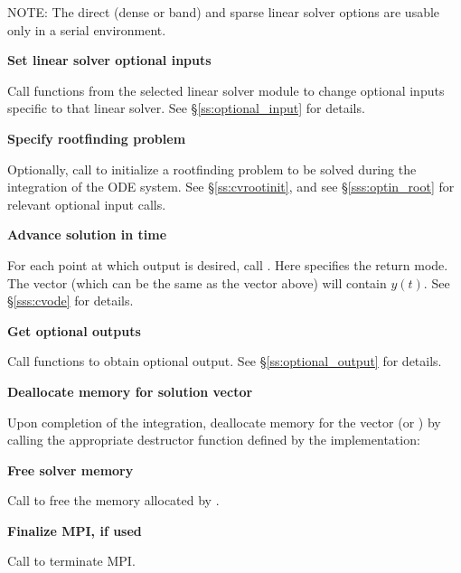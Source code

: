 \begin{Steps}
  
  
  
NOTE: The direct (dense or band) and sparse linear solver options are
usable only in a serial environment.

\item
  {\bf Set linear solver optional inputs}

  Call  functions from the selected linear solver module to
  change optional inputs specific to that linear solver.
  See \S\ref{ss:optional_input} for details.

\item
  {\bf Specify rootfinding problem}

  Optionally, call  to initialize a rootfinding problem
  to be solved during the integration of the ODE system.
  See \S\ref{ss:cvrootinit}, and see \S\ref{sss:optin_root} for
  relevant optional input calls.

\item
  {\bf Advance solution in time}

  For each point at which output is desired, call
  .
  Here  specifies the return mode.
  The vector  (which can be the same as
  the vector  above) will contain $y(t)$.
  See \S\ref{sss:cvode} for details.
  
\item
  {\bf Get optional outputs}

  Call  functions to obtain optional output.
  See \S\ref{ss:optional_output} for details.

\item
  {\bf Deallocate memory for solution vector}

  Upon completion of the integration, deallocate memory for the vector 
  (or ) by calling the appropriate destructor function defined by the
  {\nvector} implementation:


\item
  {\bf Free solver memory}

  Call  to free the memory allocated by {\cvode}.
  
\item 
  {\bf Finalize MPI, if used}

  Call  to terminate MPI.
  
\end{Steps}

